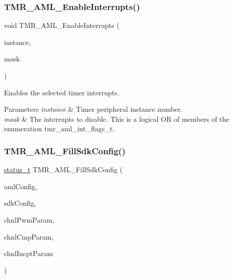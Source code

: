 \subsubsection{\texorpdfstring{TMR\_AML\_EnableInterrupts()}{TMR\_AML\_EnableInterrupts()}}
{\footnotesize\ttfamily void T\+M\+R\+\_\+\+A\+M\+L\+\_\+\+Enable\+Interrupts (\begin{DoxyParamCaption}\item[{\mbox{\hyperlink{common__aml_8h_a562bd37c7d07adcedec5993bc0cd96e5}{aml\+\_\+instance\+\_\+t}}}]{instance,  }\item[{uint16\+\_\+t}]{mask }\end{DoxyParamCaption})}



Enables the selected timer interrupts. 


\begin{DoxyParams}{Parameters}
{\em instance} & Timer peripheral instance number. \\
\hline
{\em mask} & The interrupts to disable. This is a logical OR of members of the enumeration tmr\+\_\+aml\+\_\+int\+\_\+flags\+\_\+t. \\
\hline
\end{DoxyParams}
\mbox{\label{group__function__group_ga519c237aa1084801bf11b68d5a7478f2}} 
\subsubsection{\texorpdfstring{TMR\_AML\_FillSdkConfig()}{TMR\_AML\_FillSdkConfig()}}
{\footnotesize\ttfamily \mbox{\hyperlink{group__ksdk__common_gaaabdaf7ee58ca7269bd4bf24efcde092}{status\+\_\+t}} T\+M\+R\+\_\+\+A\+M\+L\+\_\+\+Fill\+Sdk\+Config (\begin{DoxyParamCaption}\item[{const \mbox{\hyperlink{structtmr__aml__config__t}{tmr\+\_\+aml\+\_\+config\+\_\+t}} $\ast$}]{aml\+Config,  }\item[{\mbox{\hyperlink{structtmr__sdk__config__t}{tmr\+\_\+sdk\+\_\+config\+\_\+t}} $\ast$}]{sdk\+Config,  }\item[{\mbox{\hyperlink{group__struct__group_ga2b5f2d9df9d1e36f051fe92e6c6f1905}{tmr\+\_\+sdk\+\_\+pwm\+\_\+ch\+\_\+config\+\_\+t}} $\ast$$\ast$}]{chnl\+Pwm\+Param,  }\item[{\mbox{\hyperlink{structtmr__sdk__outcmp__ch__t}{tmr\+\_\+sdk\+\_\+outcmp\+\_\+ch\+\_\+t}} $\ast$$\ast$}]{chnl\+Cmp\+Param,  }\item[{\mbox{\hyperlink{structtmr__sdk__incpt__ch__t}{tmr\+\_\+sdk\+\_\+incpt\+\_\+ch\+\_\+t}} $\ast$$\ast$}]{chnl\+Incpt\+Param }\end{DoxyParamCaption})}



